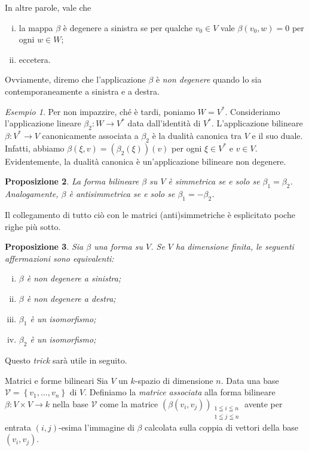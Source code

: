 \documentclass[a4paper]{amsproc}
\makeatletter
\newcommand{\en}[1]{\foreignlanguage{english}{\em #1}}
\theoremstyle{plain}
\newtheorem{prp}{Proposizione}[section]
\theoremstyle{definition}
\theoremstyle{remark}
\newtheorem{esempio}[prp]{Esempio}
\def\paragraph{\@startsection{paragraph}{4}%
  \z@\z@{-\fontdimen2\font}%
  {\normalfont\bfseries}}
\makeatother
\begin{document}
In altre parole, vale che
\begin{enumerate}[(i)]
\item la mappa $ \beta $ è degenere a sinistra se per qualche $ v_0\in V $ vale $ \beta(v_0,w) = 0 $ per ogni $ w\in W $;
\item eccetera.
\end{enumerate}

Ovviamente, diremo che l'applicazione $ \beta $ è \emph{non degenere} quando lo sia contemporaneamente a sinistra e a destra.

\begin{esempio}
  Per non impazzire, ché è tardi, poniamo $ W = V^*$. Consideriamo l'applicazione lineare $ \beta_2\colon W\to V^* $ data dall'identità di $ V^* $. L'applicazione bilineare $ \beta\colon V^*\to V $ canonicamente associata a $ \beta_2 $ è la dualità canonica tra $ V $ e il suo duale. Infatti, abbiamo $ \beta(\xi,v) = \left(\beta_2(\xi)\right)(v) $ per ogni $ \xi\in V^* $ e $ v\in V $. Evidentemente, la dualità canonica è un'applicazione bilineare non degenere.
\end{esempio}

\begin{prp}
  La forma bilineare $ \beta $ su $ V $ è simmetrica se e solo se $ \beta_1 = \beta_2 $. Analogamente, $ \beta $ è antisimmetrica se e solo se $ \beta_1 = -\beta_2 $.
\end{prp}

Il collegamento di tutto ciò con le matrici (anti)simmetriche è esplicitato poche righe più sotto.

\begin{prp}
  Sia $ \beta $ una forma su $ V $. Se $ V $ ha dimensione finita, le seguenti affermazioni sono equivalenti:
  \begin{enumerate}[(i)]
  \item $ \beta $ è non degenere a sinistra;
  \item $ \beta $ è non degenere a destra;
  \item $ \beta_1 $ è un isomorfismo;
  \item $ \beta_2 $ è un isomorfismo;
  \end{enumerate}
\end{prp}

Questo \en{trick} sarà utile in seguito.
\smallskip

\paragraph{Matrici e forme bilineari}
Sia $ V $ un $ k $-spazio di dimensione $ n $. Data una base $ \mathcal V = \left\{v_1,\dots,v_n\right\} $ di $ V $. Definiamo la \emph{matrice associata} alla forma bilineare $ \beta\colon V\times V\to k $ nella base $ \mathcal V $ come la matrice $ \left(\beta(v_i,v_j)\right)_{\substack{1\leqq i\leqq n\\1\leqq j\leqq n}} $ avente per entrata $ (i,j) $-esima l'immagine di $ \beta $ calcolata sulla coppia di vettori della base $ (v_i,v_j) $.
\end{document}
